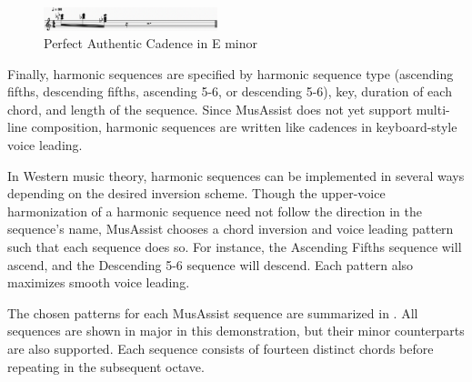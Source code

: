 \documentclass{article}
\begin{document}
\begin{figure}[h!]
\centering
\includegraphics[width=0.45\textwidth]{images/perfauth}
  \caption{Perfect Authentic Cadence in E\musFlat\; minor \label{fig:perfauth}}
  \vspace{-3mm}
\end{figure}

Finally, harmonic sequences are specified by harmonic sequence type (ascending fifths, descending fifths, ascending 5-6, or descending 5-6), key, duration of each chord, and length of the sequence. Since MusAssist does not yet support multi-line composition, harmonic sequences are written like cadences in keyboard-style voice leading.

In Western music theory, harmonic sequences can be implemented in several ways depending on the desired inversion scheme. Though the upper-voice harmonization of a harmonic sequence need not follow the direction in the sequence’s name, MusAssist chooses a chord inversion and voice leading pattern such that each sequence does so. For instance, the Ascending Fifths sequence will ascend, and the Descending 5-6 sequence will descend. Each pattern also maximizes smooth voice leading. 

The chosen patterns for each MusAssist sequence are summarized in .
All sequences are shown in major in this demonstration, but their minor counterparts are also supported. Each sequence consists of fourteen distinct chords before repeating in the subsequent octave. 
\end{document}
